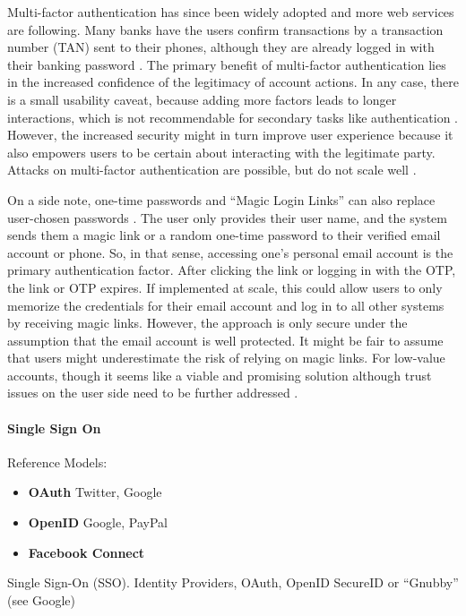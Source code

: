 	Multi-factor authentication has since been widely adopted and more web services are following. Many banks have the users confirm transactions by a transaction number (TAN) sent to their phones, although they are already logged in with their banking password \cite{Maurer2011DataTypeWarnings}. The primary benefit of multi-factor authentication lies in the increased confidence of the legitimacy of account actions. In any case, there is a small usability caveat, because adding more factors leads to longer interactions, which is not recommendable for secondary tasks like authentication \cite{Adams1999UsersEnemy}. However, the increased security might in turn improve user experience because it also empowers users to be certain about interacting with the legitimate party. Attacks on multi-factor authentication are possible, but do not scale well \cite{Herley2014CybercrimeAtScale}.
	
	On a side note, one-time passwords and ``Magic Login Links'' can also replace user-chosen passwords . The user only provides their user name, and the system sends them a magic link or a random one-time password to their verified email account or phone. So, in that sense, accessing one's personal email account is the primary authentication factor. After clicking the link or logging in with the OTP, the link or OTP expires. If implemented at scale, this could allow users to only memorize the credentials for their email account and log in to all other systems by receiving magic links. However, the approach is only secure under the assumption that the email account is well protected. It might be fair to assume that users might underestimate the risk of relying on magic links. For low-value accounts, though it seems like a viable and promising solution although trust issues on the user side need to be further addressed \cite{Ruoti2015AuthenticationMelee}.  
	
	\paragraph{Single Sign On}
	
	Reference Models:
	\cite{Egelman2013ProfilePassword,Sun2010BillionKeys}	
	\begin{itemize}
		\item \textbf{OAuth} Twitter, Google
		\item \textbf{OpenID} Google, PayPal
		\item \textbf{Facebook Connect} 
	\end{itemize}
	Single Sign-On (SSO). Identity Providers, OAuth, OpenID 
	SecureID or ``Gnubby'' (see Google)
	
